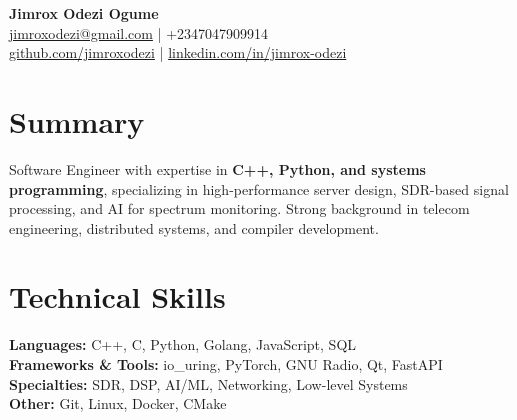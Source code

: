 \documentclass[a4paper,10pt]{article}
\begin{document}
\begin{center}
    {\LARGE \textbf{Jimrox Odezi Ogume}} \\
    \href{mailto:jimroxodezi@gmail.com}{jimroxodezi@gmail.com} \quad| \quad +2347047909914 \\
    \href{https://github.com/jimroxodezi}{github.com/jimroxodezi} \quad| \quad \href{https://www.linkedin.com/in/jimrox-odezi-376658173/}{linkedin.com/in/jimrox-odezi}
\end{center}

\section*{Summary}
Software Engineer with expertise in \textbf{C++, Python, and systems programming}, specializing in high-performance server design, SDR-based signal processing, and AI for spectrum monitoring. Strong background in telecom engineering, distributed systems, and compiler development.

\section*{Technical Skills}
\textbf{Languages:} C++, C, Python, Golang, JavaScript, SQL \\
\textbf{Frameworks \& Tools:} io\_uring, PyTorch, GNU Radio, Qt, FastAPI \\
\textbf{Specialties:} SDR, DSP, AI/ML, Networking, Low-level Systems \\
\textbf{Other:} Git, Linux, Docker, CMake

\end{document}
